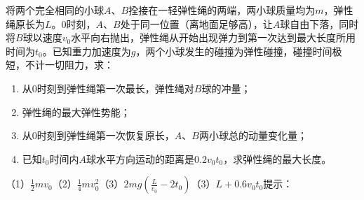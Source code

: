 将两个完全相同的小球\(A\)、\(B\)拴接在一轻弹性绳的两端，两小球质量均为\(m\)，弹性绳原长为\(L\)。0时刻，\(A\)、\(B\)处于同一位置（离地面足够高），让\(A\)球自由下落，同时将\(B\)球以速度\(v_0\)水平向右抛出，弹性绳从开始出现弹力到第一次达到最大长度所用时间为\(t_0\)。已知重力加速度为\(g\)，两个小球发生的碰撞为弹性碰撞，碰撞时间极短，不计一切阻力，求：
\begin{enumerate}
	\item 从0时刻到弹性绳第一次最长，弹性绳对\(B\)球的冲量；
	\item 弹性绳的最大弹性势能；
	\item 从0时刻到弹性绳第一次恢复原长，\(A\)、\(B\)两小球总的动量变化量；
	\item 已知\(t_0\)时间内\(A\)球水平方向运动的距离是\(0.2v_0t_0\)，求弹性绳的最大长度。
\end{enumerate}

\begin{answer}
	（1）\(\frac{1}{2}mv_0\)（2）\(\frac{1}{4}mv_0^2\)（3）\(2mg(\frac{L}{v_0} - 2t_0)\)（3）\(L + 0.6v_0t_0\)\qquad 提示：
\end{answer}
